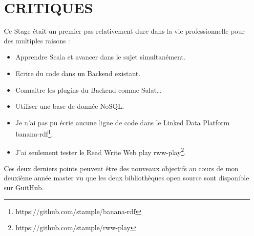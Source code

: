 \chapter{CRITIQUES}

Ce Stage était un premier pas relativement dure dans la vie professionnelle pour des multiples raisons :
\begin{itemize}
\item Apprendre Scala et avancer dans le sujet simultanément.

\item Ecrire du code dans un Backend existant.

\item Connaitre les plugins du Backend comme Salat…

\item Utiliser une base de donnée NoSQL.

\item Je n'ai pas pu écrie aucune ligne de code dans le Linked Data Platform banana-rdf\footnote{https://github.com/stample/banana-rdf}.

\item J'ai seulement tester le Read Write Web play rww-play\footnote{https://github.com/stample/rww-play}.


\end{itemize}

Ces deux derniers points peuvent être des nouveaux objectifs au cours de mon deuxième année master vu que les deux bibliothèques open source sont disponible sur GuitHub.  
